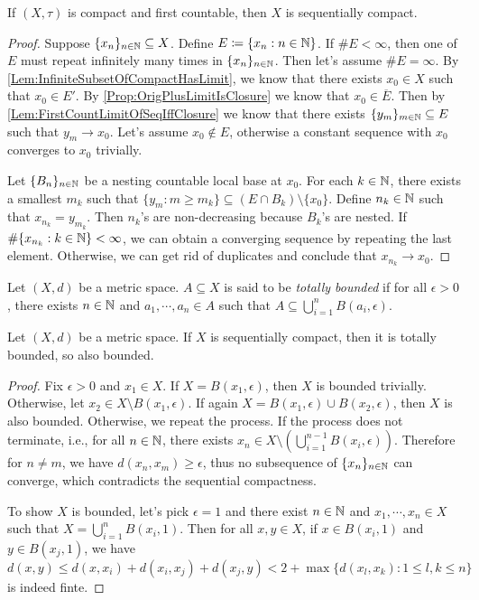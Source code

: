 \documentclass[screen]{techreport}
\numberwithin{equation}{section}
\begin{document}
\begin{proposition}\label{Prop:CompactFstCountThenSeqCompact}
	If $(X,\tau)$ is compact and first countable, then $X$ is sequentially compact.
\end{proposition}
\begin{proof}
	Suppose $\{x_n\}_{n \in \mathbb{N}} \subseteq X$.
	Define $E \coloneqq \{ x_n : n \in \mathbb{N} \}$.
	If $\#E < \infty$, then one of $E$ must repeat infinitely many times in $\{x_n\}_{n \in \mathbb{N}}$.
	Then let's assume $\#E = \infty$.
	By \cref{Lem:InfiniteSubsetOfCompactHasLimit}, we know that there exists $x_0 \in X$ such that $x_0 \in E'$.
	By \cref{Prop:OrigPlusLimitIsClosure} we know that $x_0 \in \overline{E}$.
	Then by \cref{Lem:FirstCountLimitOfSeqIffClosure} we know that there exists $\{y_m\}_{m \in \mathbb{N}} \subseteq E$ such that $y_m \rightarrow x_0$.
	Let's assume $x_0 \not\in E$, otherwise a constant sequence with $x_0$ converges to $x_0$ trivially.
	
	Let $\{B_n\}_{n \in \mathbb{N}}$ be a nesting countable local base at $x_0$.
	For each $k \in \mathbb{N}$, there exists a smallest $m_k$ such that $\{ y_m : m \ge m_k\} \subseteq (E \cap B_k) \setminus \{x_0\}$.
	Define $n_k \in \mathbb{N}$ such that $x_{n_k} = y_{m_k}$.
	Then $n_k$'s are non-decreasing because $B_k$'s are nested.
	If $\#\{ x_{n_k} : k \in \mathbb{N} \} < \infty$, we can obtain a converging sequence by repeating the last element.
	Otherwise, we can get rid of duplicates and conclude that $x_{n_k} \rightarrow x_0$.
\end{proof}

\begin{definition}\label{De:TotallyBoundedness}
	Let $(X,d)$ be a metric space.
	$A \subseteq X$ is said to be \emph{totally bounded} if for all $\epsilon > 0$, there exists $n 	\in \mathbb{N}$ and $a_1,\cdots,a_n \in A$ such that $A \subseteq \bigcup_{i=1}^n B(a_i,\epsilon)$.
\end{definition}

\begin{lemma}\label{Lem:MetricSeqCompactIsTotallyBounded}
	Let $(X,d)$ be a metric space.
	If $X$ is sequentially compact, then it is totally bounded, so also bounded.
\end{lemma}
\begin{proof}
	Fix $\epsilon > 0$ and $x_1 \in X$.
	If $X = B(x_1,\epsilon)$, then $X$ is bounded trivially.
	Otherwise, let $x_2 \in X \setminus B(x_1,\epsilon)$.
	If again $X = B(x_1,\epsilon) \cup B(x_2,\epsilon)$, then $X$ is also bounded.
	Otherwise, we repeat the process.
	If the process does not terminate, i.e., for all $n \in \mathbb{N}$, there exists $x_n \in X \setminus (\bigcup_{i=1}^{n-1} B(x_i,\epsilon))$.
	Therefore for $n \neq m$, we have $d(x_n,x_m) \ge \epsilon$, thus no subsequence of $\{x_n\}_{n \in \mathbb{N}}$ can converge, which contradicts the sequential compactness.
	
	To show $X$ is bounded, let's pick $\epsilon =1$ and there exist $n \in \mathbb{N}$ and $x_1,\cdots,x_n \in X$ such that $X = \bigcup_{i=1}^n B(x_i,1)$.
	Then for all $x,y \in X$, if $x \in B(x_i,1)$ and $y \in B(x_j,1)$, we have
	\[
	d(x,y) \le d(x,x_i) + d(x_i,x_j) + d(x_j,y) < 2 + \max\{ d(x_l,x_k): 1 \le l,k \le n \}
	\]
	is indeed finte.
\end{proof}
\end{document}

